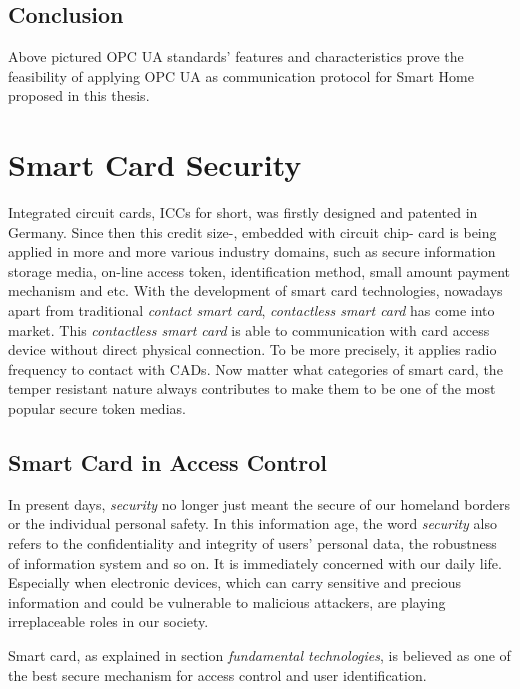 \subsection{Conclusion}
Above pictured OPC UA standards' features and characteristics prove the feasibility of applying OPC UA as communication protocol for Smart Home proposed in this thesis.

\section{Smart Card Security}
Integrated circuit cards, ICCs for short, was firstly designed and patented in Germany\cite{smart_card_history}. Since then this credit size-, embedded with circuit chip- card is being applied in more and more various industry domains, such as secure information storage media, on-line access token, identification method, small amount payment mechanism and etc. With the development of smart card technologies, nowadays apart from traditional \emph{contact smart card}, \emph{contactless smart card}\cite{smart_card_contactless} has come into market. This \emph{contactless smart card} is able to communication with card access device without direct physical connection. To be more precisely, it applies radio frequency to contact with CADs. Now matter what categories of smart card, the temper resistant nature always contributes to make them to be one of the most popular secure token medias.
\subsection{Smart Card in Access Control}\label{secSCAC}
In present days, \emph{security} no longer just meant the secure of our homeland borders or the individual personal safety. In this information age, the word \emph{security} also refers to the confidentiality and integrity of users' personal data, the robustness of information system and so on. It is immediately concerned with our daily life. Especially when electronic devices, which can carry sensitive and precious information and could be vulnerable to malicious attackers, are playing irreplaceable roles in our society. 

Smart card, as explained in section \emph{fundamental technologies}, is believed as one of the best secure mechanism for access control and user identification. 

